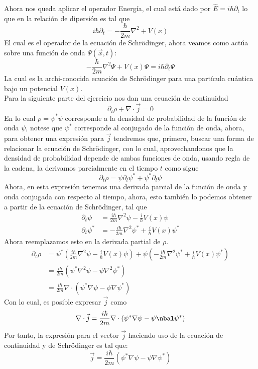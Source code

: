 \documentclass[../main_ej.tex]{subfiles}
\begin{document}
Ahora nos queda aplicar el operador Energía, el cual está dado por $\hat{E}=i\hbar\partial_t$ lo que en la relación de dipersión es tal que
\begin{equation*}
  i\hbar \partial_t = -\frac{\hbar}{2m}\nabla^2 + V(x)
\end{equation*}
El cual es el operador de la ecuación de Schrödinger, ahora veamos como actúa sobre una función de onda $\Psi(\vec{x},t)$:
\begin{equation}
  -\frac{\hbar}{2m}\nabla^2\Psi + V(x)\Psi = i\hbar \partial_t\Psi 
\end{equation}
La cual es la archi-conocida ecuación de Schrödinger para una partícula cuántica bajo un potencial $V(x)$. \\
Para la siguiente parte del ejercicio nos dan una ecuación de continuidad 
\begin{equation*}
  \partial_t\rho + \nabla \cdot \vec{j} = 0
\end{equation*}
En lo cual $\rho=\psi^*\psi$ corresponde a la densidad de probabilidad de la función de onda $\psi$, notese que $\psi^*$ corresponde al conjugado de la función de onda, ahora, para obtener una expresión para $\vec{j}$ tendremos que, primero, buscar una forma de relacionar la ecuación de Schrödinger, con lo cual, aprovechandonos que la densidad de probabilidad depende de ambas funciones de onda, usando regla de la cadena, la derivamos parcialmente en el tiempo $t$ como sigue 
\begin{equation*}
  \partial_t\rho = \psi\partial_l\psi^* + \psi^*\partial_l\psi  
\end{equation*}
Ahora, en esta expresión tenemos una derivada parcial de la función de onda y onda conjugada con respecto al tiempo, ahora, esto también lo podemos obtener a partir de la ecuación de Schrödinger, tal que
\begin{align*}
  \partial_t \psi & = \frac{i\hbar}{2m}\nabla^2 \psi -\frac{i}{\hbar}V(x)\psi \\ 
  \partial_t \psi^* & = -\frac{i\hbar}{2m}\nabla^2 \psi^* +\frac{i}{\hbar}V(x)\psi^* 
\end{align*}
Ahora reemplazamos esto en la derivada partial de $\rho$.
\begin{align*}
  \partial_t\rho & = \psi^*\left(\frac{i\hbar}{2m}\nabla^2 \psi -\frac{i}{\hbar}V(x)\psi \right) + \psi \left(  -\frac{i\hbar}{2m}\nabla^2 \psi^* +\frac{i}{\hbar}V(x)\psi^* \right) \\
  & = \frac{i\hbar}{2m} \left( \psi^* \nabla^2\psi -\psi \nabla^2\psi^* \right) \\
  & = \frac{i\hbar}{2m}\nabla \cdot \left( \psi^*\nabla \psi - \psi \nabla \psi^* \right)
\end{align*}
Con lo cual, es posible expresar $\vec{j}$ como 
\begin{equation*}
  \nabla \cdot \vec{j} = \frac{i\hbar}{2m} \nabla \cdot \left( \psi^*\nabla \psi - \psi \nbal \psi^* \right)
\end{equation*}
Por tanto, la expresión para el vector $\vec{j}$ haciendo uso de la ecuación de continuidad y de Schrödinger es tal que:
\begin{equation}
  \vec{j} = \frac{i\hbar}{2m}\left( \psi^*\nabla \psi - \psi\nabla \psi^* \right)
\end{equation}
\end{document}
